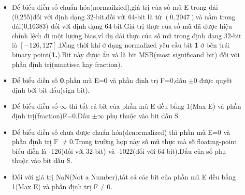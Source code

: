 \documentclass[11pt,a4paper,vietnamese]{report}
\begin{document}
\begin{itemize}
\item Để biểu diễn số chuẩn hóa(normailzied),giá trị của số mũ E trong dải (0,255)đối với định dạng 32-bit,đối với 64-bit là từ $\left(0,2047\right)$và nằm trong dải(0,16383) đối với định dạng 64-bit.Giá trị thực của số mũ đã được hiệu chỉnh lệch đi một lượng bias,ví dụ dải thực của số mũ trong định dạng 32-bit là $\left[-126,127\right]$.Đồng thời khi ở dạng normalized yêu cầu bit \textbf{1} ở bên trái binary point(\textbf{1.}).Bit này được ẩn và là bit MSB(most significand bit) đối với phần định trị(mantissa hay fraction).
\item Để biểu diễn số \textbf{0},phần mũ E=0 và phần định trị F=0,dấu $\pm0$ được quyết định bởi bit dấu(sign bit).
\item Để biểu diễn số $\infty$ thì tất cả bit của phần mũ E đều bằng 1(Max E) và phần định trị(fraction)F=0.Dấu $\pm\infty$ phụ thuộc vào bit dấu S.
\item Để biểu diễn số chưa được chuẩn hóa(denormalized) thì phần mũ E=0 và phần định trị F $\neq0$.Trong trường hợp này số mũ thực mà số floating-point biểu diễn là -126(đối với 32-bit) và -1022(đối với 64-bit).Dấu của số phụ thuộc vào bit dấu S.
\item Đối với giá trị NaN(Not a Number),tất cả các bit của phần mũ E đều bằng 1(Max E) và phần định trị F$\neq0$.
\end{itemize}
\end{document}
